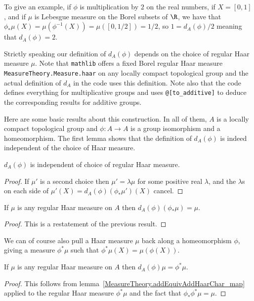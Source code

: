 To give an example, if $\phi$ is multiplication by $2$ on the real numbers,
if $X=[0,1]$, and if $\mu$ is Lebesgue measure on the Borel subsets of $\R$,
we have that $\phi_*\mu(X)=\mu(\phi^{-1}(X))=\mu([0,1/2])=1/2$,
so $1=d_A(\phi)/2$ meaning that $d_A(\phi)=2$.

Strictly speaking our definition of $d_A(\phi)$ depends on the choice of regular Haar
measure $\mu$. Note that {\tt mathlib} offers a fixed Borel regular Haar measure
{\tt MeasureTheory.Measure.haar} on any locally compact topological group
and the actual definition of $d_A$ in the code uses this definition.
Note also that the code defines everything for multiplicative groups
and uses {\tt @[to\_additive]} to deduce the corresponding results
for additive groups.

Here are some basic results about this construction. In all of them,
$A$ is a locally compact topological group and $\phi:A\to A$ is
a group isomorphism and a homeomorphism. The first lemma shows that
the definition of $d_A(\phi)$ is indeed independent of the choice of Haar measure.

\begin{lemma}
  \label{MeasureTheory.addEquivAddHaarChar_eq}
  \leanok
  $d_A(\phi)$ is independent of choice of regular Haar measure.
\end{lemma}
\begin{proof}
  \leanok
  If $\mu'$ is a second choice then $\mu'=\lambda\mu$ for some
  positive real $\lambda$, and the $\lambda$s on each side of
  $\mu'(X)=d_A(\phi)(\phi_*\mu')(X)$ cancel.
\end{proof}

\begin{lemma}
  \label{MeasureTheory.addEquivAddHaarChar_map}
  \leanok
  If $\mu$ is any regular Haar measure on $A$ then
  $d_A(\phi)(\phi_*\mu) = \mu.$
\end{lemma}
\begin{proof}
  \leanok
  This is a restatement of the previous result.
\end{proof}

We can of course also pull a Haar measure $\mu$ back along a homeomorphism $\phi$,
giving a measure $\phi^*\mu$ such that $\phi^*\mu(X)=\mu(\phi(X))$.

\begin{corollary}
  \label{MeasureTheory.addEquivAddHaarChar_comap}
  \leanok
  If $\mu$ is any regular Haar measure on $A$ then
  $d_A(\phi)\mu = \phi^*\mu.$
\end{corollary}
\begin{proof}
  \leanok
  This follows from lemma~\ref{MeasureTheory.addEquivAddHaarChar_map}
  applied to the regular Haar measure $\phi^*\mu$ and the fact that $\phi_*\phi^*\mu=\mu$.
\end{proof}

